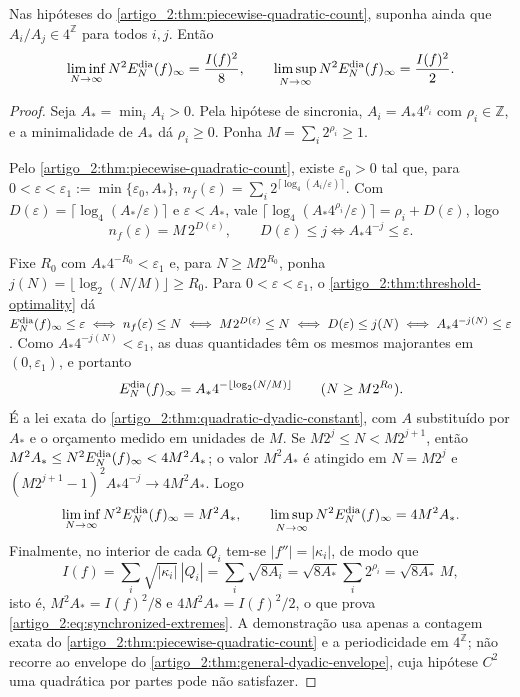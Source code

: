 \begin{corollary}\label{map:artigo_2:12.3}
\label{artigo_2:cor:synchronized-phases}
Nas hipóteses do \cref{artigo_2:thm:piecewise-quadratic-count}, suponha ainda que
$A_i/A_j\in4^{\mathbb Z}$ para todos $i,j$. Então
\begin{equation}
 \liminf_{N\to\infty}N^2E_N^{\rm dia}(f)_\infty=\frac{I(f)^2}{8},
 \qquad
 \limsup_{N\to\infty}N^2E_N^{\rm dia}(f)_\infty=\frac{I(f)^2}{2}.
 \label{artigo_2:eq:synchronized-extremes}
\end{equation}
\end{corollary}

\begin{proof}
Seja $A_\ast=\min_iA_i>0$. Pela hipótese de sincronia, $A_i=A_\ast4^{\rho_i}$ com
$\rho_i\in\mathbb Z$, e a minimalidade de $A_\ast$ dá $\rho_i\ge0$. Ponha
$M=\sum_i2^{\rho_i}\ge1$.

Pelo \cref{artigo_2:thm:piecewise-quadratic-count}, existe $\varepsilon_0>0$ tal que,
para $0<\varepsilon<\varepsilon_1:=\min\{\varepsilon_0,A_\ast\}$,
$n_f(\varepsilon)=\sum_i2^{\lceil\log_4(A_i/\varepsilon)\rceil}$. Com
$D(\varepsilon)=\lceil\log_4(A_\ast/\varepsilon)\rceil$ e $\varepsilon<A_\ast$, vale
$\lceil\log_4(A_\ast4^{\rho_i}/\varepsilon)\rceil=\rho_i+D(\varepsilon)$, logo
\[
 n_f(\varepsilon)=M\,2^{D(\varepsilon)},
 \qquad
 D(\varepsilon)\le j\iff A_\ast4^{-j}\le\varepsilon .
\]

Fixe $R_0$ com $A_\ast4^{-R_0}<\varepsilon_1$ e, para $N\ge M2^{R_0}$, ponha
$j(N)=\lfloor\log_2(N/M)\rfloor\ge R_0$. Para $0<\varepsilon<\varepsilon_1$, o
\cref{artigo_2:thm:threshold-optimality} dá
$E_N^{\rm dia}(f)_\infty\le\varepsilon\iff n_f(\varepsilon)\le N\iff
M2^{D(\varepsilon)}\le N\iff D(\varepsilon)\le j(N)\iff A_\ast4^{-j(N)}\le\varepsilon$.
Como $A_\ast4^{-j(N)}<\varepsilon_1$, as duas quantidades têm os mesmos majorantes
em $(0,\varepsilon_1)$, e portanto
\[
 E_N^{\rm dia}(f)_\infty=A_\ast4^{-\lfloor\log_2(N/M)\rfloor}
 \qquad(N\ge M2^{R_0}).
\]
É a lei exata do \cref{artigo_2:thm:quadratic-dyadic-constant}, com $A$ substituído
por $A_\ast$ e o orçamento medido em unidades de $M$. Se
$M2^j\le N<M2^{j+1}$, então $M^2A_\ast\le N^2E_N^{\rm dia}(f)_\infty<4M^2A_\ast$;
o valor $M^2A_\ast$ é atingido em $N=M2^j$ e
$(M2^{j+1}-1)^2A_\ast4^{-j}\to4M^2A_\ast$. Logo
\[
 \liminf_{N\to\infty}N^2E_N^{\rm dia}(f)_\infty=M^2A_\ast,
 \qquad
 \limsup_{N\to\infty}N^2E_N^{\rm dia}(f)_\infty=4M^2A_\ast .
\]
Finalmente, no interior de cada $Q_i$ tem-se $|f''|=|\kappa_i|$, de modo que
\[
 I(f)=\sum_i\sqrt{|\kappa_i|}\,|Q_i|=\sum_i\sqrt{8A_i}
 =\sqrt{8A_\ast}\sum_i2^{\rho_i}=\sqrt{8A_\ast}\,M,
\]
isto é, $M^2A_\ast=I(f)^2/8$ e $4M^2A_\ast=I(f)^2/2$, o que prova
\eqref{artigo_2:eq:synchronized-extremes}. A demonstração usa apenas a contagem
exata do \cref{artigo_2:thm:piecewise-quadratic-count} e a periodicidade em
$4^{\mathbb Z}$; não recorre ao envelope do
\cref{artigo_2:thm:general-dyadic-envelope}, cuja hipótese $C^2$ uma quadrática por
partes pode não satisfazer.
\end{proof}

